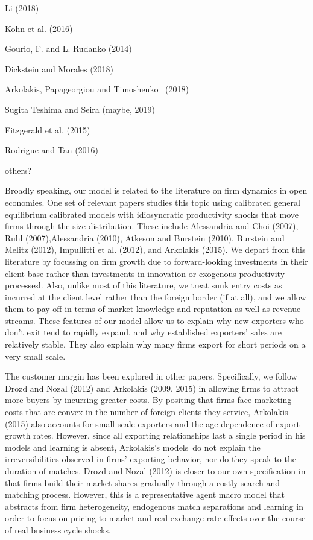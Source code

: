 \documentclass[12pt]{article}
\begin{document}
Li (2018)

Kohn et al. (2016)

Gourio, F. and L. Rudanko (2014)

Dickstein and Morales (2018)

Arkolakis, Papageorgiou and Timoshenko \ (2018)

Sugita Teshima and Seira (maybe, 2019)

Fitzgerald et al. (2015)

Rodrigue and Tan (2016)

others?

\bigskip

Broadly speaking, our model is related to the literature on firm dynamics in
open economies. One set of relevant papers studies this topic using
calibrated general equilibrium calibrated models with idiosyncratic
productivity shocks that move firms through the size distribution. These
include Alessandria and Choi (2007), Ruhl (2007),Alessandria (2010), Atkeson
and Burstein (2010), Burstein and Melitz (2012), Impullitti et al. (2012),
and Arkolakis (2015). We depart from this literature by focussing on firm
growth due to forward-looking investments in their client base rather than
investments in innovation or exogenous productivity processesl. Also, unlike
most of this literature, we treat sunk entry costs as incurred at the client
level rather than the foreign border (if at all), and we allow them to pay
off in terms of market knowledge and reputation as well as revenue streams.
These features of our model allow us to explain why new exporters who don't
exit tend to rapidly expand, and why established exporters' sales are
relatively stable. They also explain why many firms export for short periods
on a very small scale.

The customer margin has been explored in other papers. Specifically, we
follow Drozd and Nozal (2012) and Arkolakis (2009, 2015) in allowing firms
to attract more buyers by incurring greater costs. By positing that firms
face marketing costs that are convex in the number of foreign clients they
service, Arkolakis (2015) also accounts for small-scale exporters and the
age-dependence of export growth rates. However, since all exporting
relationships last a single period in his models and learning is absent,
Arkolakis's models\ do not explain the irreversibilities observed in firms'
exporting behavior, nor do they speak to the duration of matches. Drozd and
Nozal (2012) is closer to our own specification in that firms build their
market shares gradually through a costly search and matching process.
However, this is a representative agent macro model that abstracts from firm
heterogeneity, endogenous match separations and learning in order to focus
on pricing to market and real exchange rate effects over the course of real
business cycle shocks.
\end{document}
